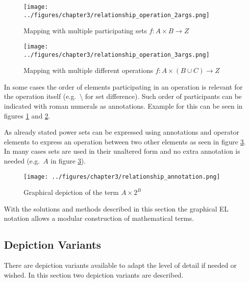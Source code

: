 \documentclass[twoside, openright, 12pt]{book}
\begin{document}
\begin{figure}[!htb]
	\centering
	\texttt{[image: ../figures/chapter3/relationship\_operation\_2args.png]}
	\caption{Mapping with multiple participating sets $f:A \times B \rightarrow Z$}
	\label{fig:relationship_operation_2args}
\end{figure}

\begin{figure}[!htb]
	\centering
	\texttt{[image: ../figures/chapter3/relationship\_operation\_3args.png]}
	\caption{Mapping with multiple different operations $f:A \times ( B \cup C ) \rightarrow Z$ }
	\label{fig:relationship_operation_3args}
\end{figure}

\noindent
In some cases the order of elements participating in an operation is relevant for the operation itself (e.g.~$\setminus$ for set difference).
Such order of participants can be indicated with roman numerals as annotations.
Example for this can be seen in figures \ref{fig:relationship_operation_2args} and \ref{fig:relationship_operation_3args}.


As already stated power sets can be expressed using annotations and operator elements to express an operation between two other elements as seen in figure \ref{fig:relationship_annotation}.
In many cases sets are used in their unaltered form and no extra annotation is needed (e.g.\ $A$ in figure \ref{fig:relationship_annotation}).

\begin{figure}[htb]
	\centering
	\texttt{[image: ../figures/chapter3/relationship\_annotation.png]}
	\caption{Graphical depiction of the term $A \times 2^B$}
	\label{fig:relationship_annotation}
\end{figure}

\noindent
With the solutions and methods described in this section the graphical EL notation allows a modular construction of mathematical terms.



\subsection{Depiction Variants}
\label{variants}
There are depiction variants available to adapt the level of detail if needed or wished.
In this section two depiction variants are described.
\end{document}

